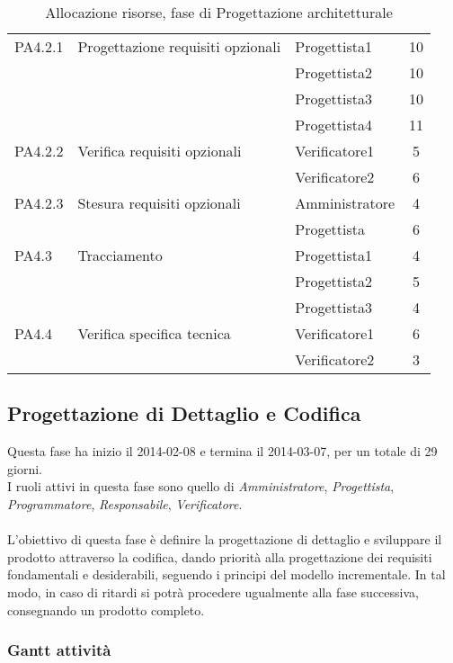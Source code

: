 \begin{table}[H]
\begin{tabular}{ l l l c  }
	\cline{3-4}
	PA4.2.1 & Progettazione requisiti opzionali & Progettista1 & 10\\ 
	& & Progettista2 & 10\\
	& & Progettista3 & 10\\
	& & Progettista4 & 11\\
    \cline{3-4}
	PA4.2.2 & Verifica requisiti opzionali & Verificatore1 &  5\\
	& & Verificatore2 & 6\\
	\cline{3-4}
	PA4.2.3 & Stesura requisiti opzionali & Amministratore &  4\\
	& & Progettista & 6\\
	\cline{3-4}
	PA4.3 & Tracciamento & Progettista1 &  4\\
	& & Progettista2 & 5\\
	& & Progettista3 & 4\\
	\cline{3-4}
	PA4.4 & Verifica specifica tecnica & Verificatore1 &  6\\
	& & Verificatore2 & 3\\
	
	\hline
	\end{tabular}
	\caption{Allocazione risorse, fase di Progettazione architetturale}
	\end{table}
	
	\subsection{Progettazione di Dettaglio e Codifica}
	 
Questa fase ha inizio il 2014-02-08 e termina il 2014-03-07, per un totale di 29  giorni. \\
I ruoli attivi in questa fase sono quello di \textit{Amministratore}, \textit{Progettista}, \textit{Programmatore}, \textit{Responsabile}, \textit{Verificatore}. \\ \\
L'obiettivo di questa fase è definire la progettazione di dettaglio e sviluppare il prodotto attraverso la codifica, dando priorità alla progettazione dei requisiti fondamentali e desiderabili, seguendo i principi del modello incrementale.
In tal modo, in caso di ritardi si potrà procedere ugualmente alla fase successiva, consegnando un prodotto completo.
\subsubsection{Gantt attività}

